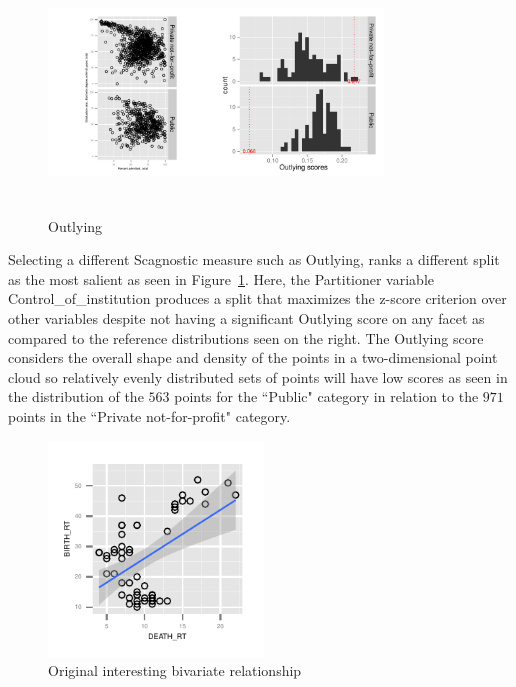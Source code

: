 \begin{figure}
\includegraphics[width=3.5in,height=2.5in]{images/3_0003032851242-Control_of_institution.pdf}
  \caption{Outlying}
 \label{fig:outlying1}
\end{figure}

Selecting a different Scagnostic measure such as Outlying, ranks a different split as the most salient as seen in Figure~\ref{fig:outlying1}. Here, the Partitioner variable Control\_of\_institution produces a split that maximizes the z-score criterion over other variables despite not having a significant Outlying score on any facet as compared to the reference distributions seen on the right. The Outlying score considers the overall shape and density of the points in a two-dimensional point cloud so relatively evenly distributed sets of points will have low scores as seen in the distribution of the $563$ points for the ``Public" category in relation to the $971$ points in the ``Private not-for-profit" category.

\begin{figure}
 \centering 
\includegraphics[width=2.25in,height=2.25in]{images/DEATH_RT-BIRTH_RT.pdf}
  \caption{Original interesting bivariate relationship}
 \label{fig:original2}
\end{figure}

